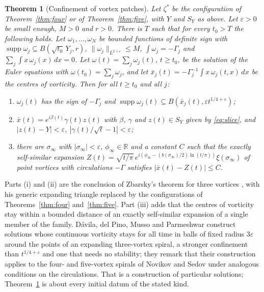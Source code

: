 \documentclass[11pt]{article}
\newtheorem{theorem}{Theorem}
\theoremstyle{definition}
\newcommand{\R}{\mathbb{R}}
\begin{document}
\begin{theorem}[Confinement of vortex patches]\label{thm:patches}
Let $\zeta^*$ be the configuration of Theorem~\ref{thm:four} or of Theorem~\ref{thm:five}, with $Y$ and $S_Y$ as above. Let $\varepsilon > 0$ be small enough, $M > 0$ and $r > 0$. There is $T$ such that for every $t_0 > T$ the following holds. Let $\omega_1, \ldots, \omega_N$ be bounded functions of definite sign with $\operatorname{supp}\omega_j \subseteq B(\sqrt{t_0}\,Y_j, r)$, $\|\omega_j\|_{L^{2+\varepsilon}} \le M$, $\int\omega_j = -\Gamma_j$ and $\sum_j\int x\,\omega_j(x)\,dx = 0$. Let $\omega(t) = \sum_j\omega_j(t)$, $t \ge t_0$, be the solution of the Euler equations with $\omega(t_0) = \sum_j\omega_j$, and let $\bar x_j(t) = -\Gamma_j^{-1}\int x\,\omega_j(t, x)\,dx$ be the centres of vorticity. Then for all $t \ge t_0$ and all $j$:
\begin{enumerate}
\item[(i)] $\omega_j(t)$ has the sign of $-\Gamma_j$ and $\operatorname{supp}\omega_j(t) \subseteq B(\bar x_j(t), \varepsilon t^{1/4 + \varepsilon})$;
\item[(ii)] $\bar x(t) = e^{i\beta(t)}\gamma(t)z(t)$ with $\beta$, $\gamma$ and $z(t) \in S_Y$ given by \eqref{eq:slice}, and $|z(t) - Y| < \varepsilon$, $|\gamma(t)/\sqrt t - 1| < \varepsilon$;
\item[(iii)] there are $\sigma_\infty$ with $|\sigma_\infty| < \varepsilon$, $\phi_\infty \in \R$ and a constant $C$ such that the exactly self-similar expansion $Z(t) = \sqrt{t/\pi}\,e^{i(\phi_\infty - (b(\sigma_\infty)/2)\ln(t/\pi))}\xi(\sigma_\infty)$ of point vortices with circulations $-\Gamma$ satisfies $|\bar x(t) - Z(t)| \le C$.
\end{enumerate}
\end{theorem}

Parts (i) and (ii) are the conclusion of Zbarsky's theorem for three vortices \cite[Theorem~2]{zbarsky2021}, with his generic expanding triangle replaced by the configurations of Theorems~\ref{thm:four} and~\ref{thm:five}. Part (iii) adds that the centres of vorticity stay within a bounded distance of an exactly self-similar expansion of a single member of the family. Dávila, del Pino, Musso and Parmeshwar \cite{dpmp2024} construct solutions whose continuous vorticity stays for all time in balls of fixed radius $3\varepsilon$ around the points of an expanding three-vortex spiral, a stronger confinement than $t^{1/4+\varepsilon}$ and one that needs no stability; they remark that their construction applies to the four- and five-vortex spirals of Novikov and Sedov \cite{ns1979} under analogous conditions on the circulations. That is a construction of particular solutions; Theorem~\ref{thm:patches} is about every initial datum of the stated kind.
\end{document}
